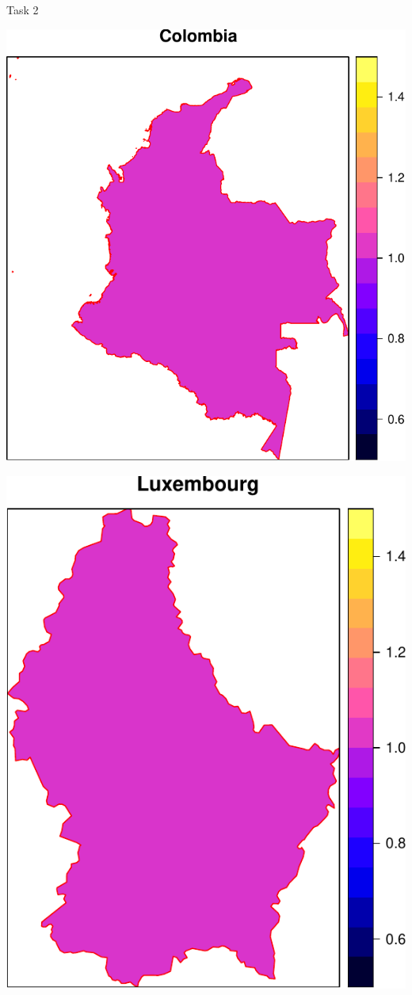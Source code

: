 \documentclass[
  ignorenonframetext,
  aspectratio=169,
]{beamer}
\begin{document}
\begin{frame}[fragile]{Task 2}
\linespread{2}

\linespread{0.5}

\includegraphics{global_n_files/figure-beamer/unnamed-chunk-8-1.pdf}

\includegraphics{global_n_files/figure-beamer/unnamed-chunk-8-2.pdf}


\end{frame}
\end{document}
